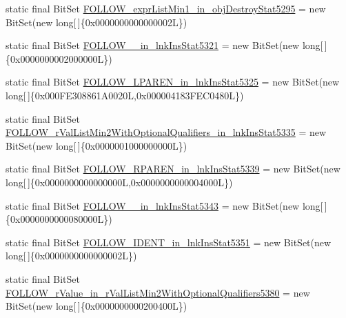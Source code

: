 \begin{DoxyCompactItemize}
\item 
static final Bit\-Set \hyperlink{classorg_1_1tzi_1_1use_1_1parser_1_1testsuite_1_1_test_suite_parser_a296a27b0655b4f28daeecd3260546e01}{F\-O\-L\-L\-O\-W\-\_\-expr\-List\-Min1\-\_\-in\-\_\-obj\-Destroy\-Stat5295} = new Bit\-Set(new long\mbox{[}$\,$\mbox{]}\{0x0000000000000002\-L\})
\item 
static final Bit\-Set \hyperlink{classorg_1_1tzi_1_1use_1_1parser_1_1testsuite_1_1_test_suite_parser_adc7aab6f60748d581d2e29c39ac57a82}{F\-O\-L\-L\-O\-W\-\_\-\_\-in\-\_\-lnk\-Ins\-Stat5321} = new Bit\-Set(new long\mbox{[}$\,$\mbox{]}\{0x0000000002000000\-L\})
\item 
static final Bit\-Set \hyperlink{classorg_1_1tzi_1_1use_1_1parser_1_1testsuite_1_1_test_suite_parser_aa86e6ea220e725668de5d5c493f79cef}{F\-O\-L\-L\-O\-W\-\_\-\-L\-P\-A\-R\-E\-N\-\_\-in\-\_\-lnk\-Ins\-Stat5325} = new Bit\-Set(new long\mbox{[}$\,$\mbox{]}\{0x000\-F\-E308861\-A0020\-L,0x000004183\-F\-E\-C0480\-L\})
\item 
static final Bit\-Set \hyperlink{classorg_1_1tzi_1_1use_1_1parser_1_1testsuite_1_1_test_suite_parser_aa87dcce073b0d8e2136ded91d08ed33d}{F\-O\-L\-L\-O\-W\-\_\-r\-Val\-List\-Min2\-With\-Optional\-Qualifiers\-\_\-in\-\_\-lnk\-Ins\-Stat5335} = new Bit\-Set(new long\mbox{[}$\,$\mbox{]}\{0x0000001000000000\-L\})
\item 
static final Bit\-Set \hyperlink{classorg_1_1tzi_1_1use_1_1parser_1_1testsuite_1_1_test_suite_parser_a5e0c3637320b4bf9b6ef348e169fb528}{F\-O\-L\-L\-O\-W\-\_\-\-R\-P\-A\-R\-E\-N\-\_\-in\-\_\-lnk\-Ins\-Stat5339} = new Bit\-Set(new long\mbox{[}$\,$\mbox{]}\{0x0000000000000000\-L,0x0000000000004000\-L\})
\item 
static final Bit\-Set \hyperlink{classorg_1_1tzi_1_1use_1_1parser_1_1testsuite_1_1_test_suite_parser_aa45c383ac4f6cec2ad0c4159a06d5e0f}{F\-O\-L\-L\-O\-W\-\_\-\_\-in\-\_\-lnk\-Ins\-Stat5343} = new Bit\-Set(new long\mbox{[}$\,$\mbox{]}\{0x0000000000080000\-L\})
\item 
static final Bit\-Set \hyperlink{classorg_1_1tzi_1_1use_1_1parser_1_1testsuite_1_1_test_suite_parser_aef96052f60e96d50318cb87a9e9a4133}{F\-O\-L\-L\-O\-W\-\_\-\-I\-D\-E\-N\-T\-\_\-in\-\_\-lnk\-Ins\-Stat5351} = new Bit\-Set(new long\mbox{[}$\,$\mbox{]}\{0x0000000000000002\-L\})
\item 
static final Bit\-Set \hyperlink{classorg_1_1tzi_1_1use_1_1parser_1_1testsuite_1_1_test_suite_parser_a6cac75be727118132bae8214dafe071e}{F\-O\-L\-L\-O\-W\-\_\-r\-Value\-\_\-in\-\_\-r\-Val\-List\-Min2\-With\-Optional\-Qualifiers5380} = new Bit\-Set(new long\mbox{[}$\,$\mbox{]}\{0x0000000000200400\-L\})

\end{DoxyCompactItemize}
